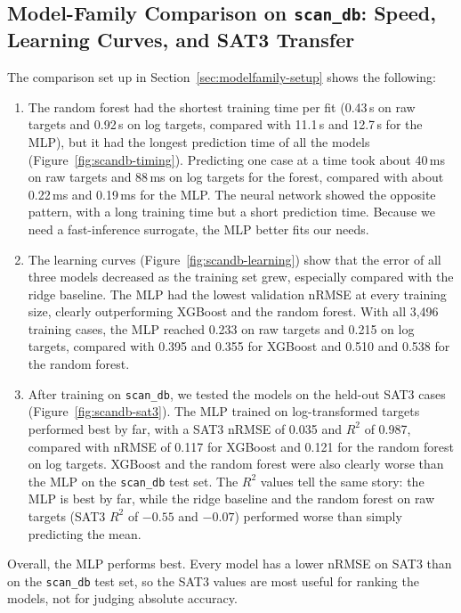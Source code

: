\documentclass[12pt,letterpaper]{article}
\begin{document}
\subsection{Model-Family Comparison on \texttt{scan\_db}: Speed, Learning Curves, and SAT3 Transfer}
\label{sec:modelfamily-results}

The comparison set up in Section~\ref{sec:modelfamily-setup} shows the following:
\begin{enumerate}
  \item The random forest had the shortest training time per fit (0.43\,s on
        raw targets and 0.92\,s on log targets, compared with 11.1\,s and
        12.7\,s for the MLP), but it had the longest prediction time of all
        the models (Figure~\ref{fig:scandb-timing}). Predicting one case at a
        time took about 40\,ms on raw targets and 88\,ms on log targets for
        the forest, compared with about 0.22\,ms and 0.19\,ms for the MLP. The
        neural network showed the opposite pattern, with a long training time
        but a short prediction time. Because we need a fast-inference
        surrogate, the MLP better fits our needs.
  \item The learning curves (Figure~\ref{fig:scandb-learning}) show that the
        error of all three models decreased as the training set grew,
        especially compared with the ridge baseline. The MLP had the lowest
        validation nRMSE at every training size, clearly outperforming
        XGBoost and the random forest. With all 3,496 training cases, the MLP
        reached 0.233 on raw targets and 0.215 on log targets, compared with
        0.395 and 0.355 for XGBoost and 0.510 and 0.538 for the random forest.
  \item After training on \texttt{scan\_db}, we tested the models on the
        held-out SAT3 cases (Figure~\ref{fig:scandb-sat3}). The MLP trained
        on log-transformed targets performed best by far, with a SAT3 nRMSE of
        0.035 and $R^2$ of 0.987, compared with nRMSE of 0.117 for XGBoost and
        0.121 for the random forest on log targets. XGBoost and the random
        forest were also clearly worse than the MLP on the \texttt{scan\_db}
        test set. The $R^2$ values tell the same story: the MLP is best by far,
        while the ridge baseline and the random forest on raw targets (SAT3
        $R^2$ of $-0.55$ and $-0.07$) performed worse than simply predicting
        the mean.
\end{enumerate}
Overall, the MLP performs best. Every model has a lower nRMSE on SAT3 than on
the \texttt{scan\_db} test set, so the SAT3 values are most useful for ranking
the models, not for judging absolute accuracy.
\end{document}
